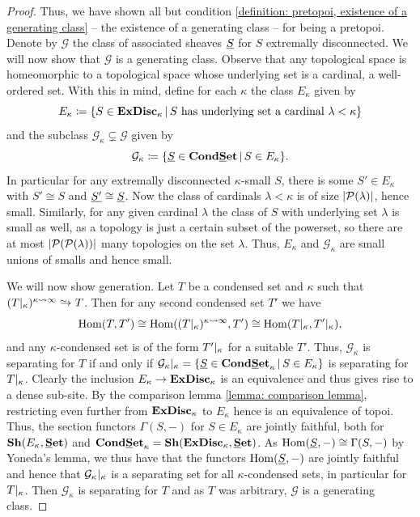 \begin{proof}
	Thus, we have shown all but condition \ref{definition: pretopoi, existence of a generating class} -- the existence of a generating class -- for being a pretopoi.  Denote by $\mathcal G$ the class of associated sheaves $\underline{S}$ for $S$ extremally disconnected. We will now show that $\mathcal G$ is a generating class. Observe that any topological space is homeomorphic to a topological space whose underlying set is a cardinal, \ie a well-ordered set. With this in mind, define for each $\kappa$ the class $E_\kappa$ given by
	$$E_\kappa \coloneqq \{S \in {\mathbf{ExDisc}}_{\kappa}\,\vert\, \text{$S$ has underlying set a cardinal $\lambda < \kappa$}\}$$
	and the subclass $\mathcal G_\kappa\subsetneq \mathcal G$ given by
	$$\mathcal G_\kappa\coloneqq \{\underline{S} \in {{{\mathbf{Cond}}}{{\mathbf{\underline{S}et}}}} \,\vert\, S\in E_\kappa\}.$$
	In particular for any extremally disconnected $\kappa$-small $S$, there is some $S'\in E_\kappa$ with $S'\cong S$ and $\underline{S'}\cong \underline{S}$. Now the class of cardinals $\lambda < \kappa$ is of size $\vert{\mathcal P(\lambda)}\vert$, hence small. Similarly, for any given cardinal $\lambda$ the class of $S$ with underlying set $\lambda$ is small as well, as a topology is just a certain subset of the powerset, so there are at most $\vert{\mathcal P({\mathcal P(\lambda)})}\vert$ many topologies on the set $\lambda$. Thus, $E_\kappa$ and $\mathcal G_\kappa$ are small unions of smalls and hence small. 
	
	We will now show generation. Let $T$ be a condensed set and $\kappa$ such that $(T\resTo{\kappa})^\enlargementsymbol{\kappa}{\infty}\shortisorightarrow T$. Then for any second condensed set $T'$ we have
	$${\operatorname{Hom}}(T, T')\cong {\operatorname{Hom}}((T{\vert_{\kappa}})^{\kappa\rightsquigarrow \infty}, T')\cong {\operatorname{Hom}}(T{\vert_{\kappa}}, T'{\vert_{\kappa}}),$$
	and any $\kappa$-condensed set is of the form $T'{\vert_{\kappa}}$ for a suitable $T'$. Thus, $\mathcal G_\kappa$ is separating for $T$ if and only if $\mathcal G_\kappa{\vert_{\kappa}}=\{\underline{S}\in {{{\mathbf{Cond}}}{{\mathbf{\underline{S}et}}}_{\kappa}}\,\vert\, S\in E_\kappa\}$ is separating for $T{\vert_{\kappa}}$. Clearly the inclusion $E_\kappa \to {\mathbf{ExDisc}}_{\kappa}$ is an equivalence and thus gives rise to a dense sub-site. By the comparison lemma \ref{lemma: comparison lemma}, restricting even further from ${\mathbf{ExDisc}}_{\kappa}$ to $E_\kappa$ hence is an equivalence of topoi. Thus, the section functors $\Gamma(S, -)$ for $S\in E_\kappa$ are jointly faithful, both for $\Sheaves{E_\kappa}{\Set}$ and $\boundedCondensedSets{\kappa}=\Sheaves{\boundedExtremallyDisconnectedSets{\kappa}}{\Set}$. As ${\operatorname{Hom}}(\underline{S}, -)\cong \Gamma(S, -)$ by Yoneda's lemma, we thus have that the functors ${\operatorname{Hom}}(\underline{S}, -)$ are jointly faithful and hence that $\mathcal G_\kappa{\vert_{\kappa}}$ is a separating set for all $\kappa$-condensed sets, in particular for $T{\vert_{\kappa}}$. Then $\mathcal G_\kappa$ is separating for $T$ and as $T$ was arbitrary, $\mathcal G$ is a generating class.
	

\end{proof}
